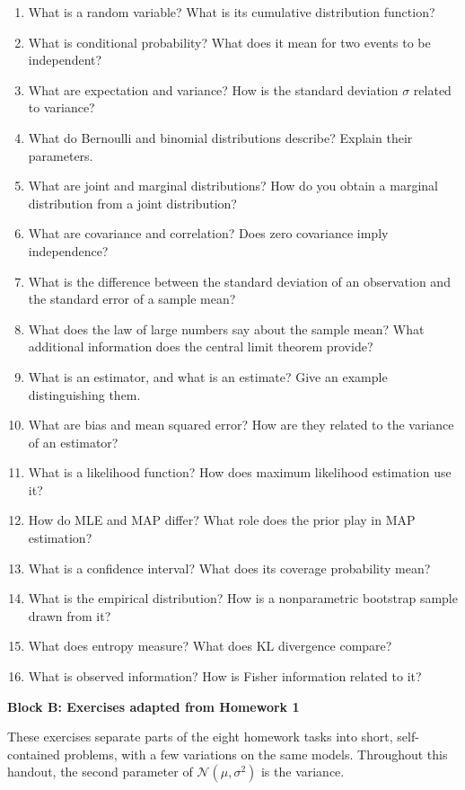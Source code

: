 \documentclass[11pt,a4paper]{article}
\newcommand{\blocktitle}[2]{{\Large\sffamily\bfseries\color{Ink}Block #1: #2}\par\vspace{5pt}}
\begin{document}
{\small
\begin{enumerate}[label=\textbf{A\arabic*.},leftmargin=10mm,itemsep=4pt,topsep=3pt,parsep=0pt]
\item What is a random variable? What is its cumulative distribution function?
\item What is conditional probability? What does it mean for two events to be independent?
\item What are expectation and variance? How is the standard deviation $\sigma$ related to variance?
\item What do Bernoulli and binomial distributions describe? Explain their parameters.
\item What are joint and marginal distributions? How do you obtain a marginal distribution from a joint distribution?
\item What are covariance and correlation? Does zero covariance imply independence?
\item What is the difference between the standard deviation of an observation and the standard error of a sample mean?
\item What does the law of large numbers say about the sample mean? What additional information does the central limit theorem provide?
\item What is an estimator, and what is an estimate? Give an example distinguishing them.
\item What are bias and mean squared error? How are they related to the variance of an estimator?
\item What is a likelihood function? How does maximum likelihood estimation use it?
\item How do MLE and MAP differ? What role does the prior play in MAP estimation?
\item What is a confidence interval? What does its coverage probability mean?
\item What is the empirical distribution? How is a nonparametric bootstrap sample drawn from it?
\item What does entropy measure? What does KL divergence compare?
\item What is observed information? How is Fisher information related to it?
\end{enumerate}
}
\newpage
\blocktitle{B}{Exercises adapted from Homework 1}
These exercises separate parts of the eight homework tasks into short,
self-contained problems, with a few variations on the same models.
Throughout this handout, the second parameter of $\mathcal N(\mu,\sigma^2)$
is the variance.
\end{document}

